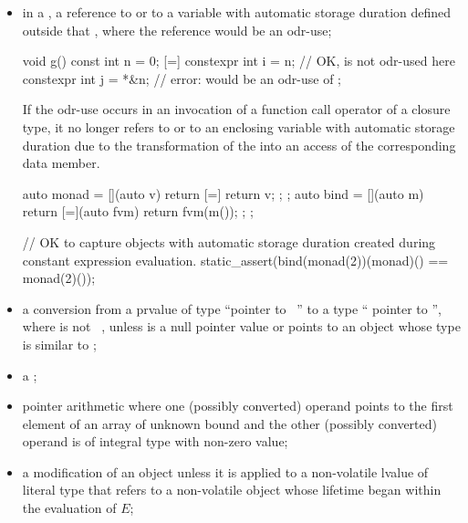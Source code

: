 \begin{itemize}
\item
in a ,
a reference to  or to a variable with
automatic storage duration defined outside that
, where
the reference would be an odr-use;
\begin{example}
\begin{codeblock}
void g() {
  const int n = 0;
  [=] {
    constexpr int i = n;        // OK,  is not odr-used here
    constexpr int j = *&n;      // error:  would be an odr-use of 
  };
}
\end{codeblock}
\end{example}
\begin{note}
If the odr-use occurs in an invocation
of a function call operator of a closure type,
it no longer refers to  or to an enclosing
variable with automatic storage duration
due to the transformation
of the  into
an access of the corresponding data member.
\begin{example}
\begin{codeblock}
auto monad = [](auto v) { return [=] { return v; }; };
auto bind = [](auto m) {
  return [=](auto fvm) { return fvm(m()); };
};

// OK to capture objects with automatic storage duration created during constant expression evaluation.
static_assert(bind(monad(2))(monad)() == monad(2)());
\end{codeblock}
\end{example}
\end{note}

\item
a conversion
from a prvalue  of type ``pointer to \cv{}~''
to a type `` pointer to  '',
where   is not ~,
unless 
is a null pointer value or
points to an object whose type is similar to ;

\item
a ;

\item
pointer arithmetic where
one (possibly converted) operand
points to the first element of an array of unknown bound and
the other (possibly converted) operand
is of integral type with non-zero value;

\item
a modification of an object
unless it is applied to a non-volatile lvalue of literal type
that refers to a non-volatile object
whose lifetime began within the evaluation of $E$;


\end{itemize}
